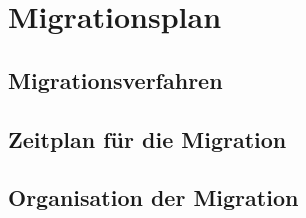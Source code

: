 \section{Migrationsplan}
\subsection{Migrationsverfahren}
\subsection{Zeitplan für die Migration}
\subsection{Organisation der Migration}
